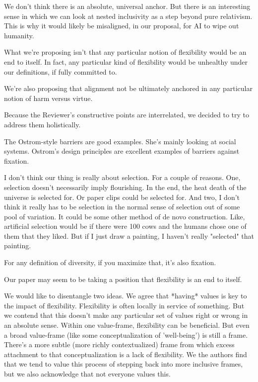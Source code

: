 \documentclass[fontsize=11.5pt]{scrartcl}
\newcounter{point}
\begin{document}
We don't think there is an absolute, universal anchor. But there is an interesting sense in which we can look at nested inclusivity as a step beyond pure relativism. This is why it would likely be misaligned, in our proposal, for AI to wipe out humanity. 

What we're proposing isn't that any particular notion of flexibility would be an end to itself. In fact, any particular kind of flexibility would be unhealthy under our definitions, if fully committed to. 


We're also proposing that alignment not be ultimately anchored in any particular notion of harm versus virtue. 


Because the Reviewer's constructive points are interrelated, we decided to try to address them holistically.


The Ostrom-style barriers are good examples. She's mainly looking at social systems. Ostrom's design principles are excellent examples of barriers against fixation. 

I don't think our thing is really about selection. For a couple of reasons. One, selection doesn't necessarily imply flourishing. In the end, the heat death of the universe is selected for. Or paper clips could be selected for. And two, I don't think it really has to be selection in the normal sense of selection out of some pool of variation. It could be some other method of de novo construction. Like, artificial selection would be if there were 100 cows and the humans chose one of them that they liked. But if I just draw a painting, I haven't really "selected" that painting.

For any definition of diversity, if you maximize that, it's also fixation.



Our paper may seem to be taking a position that flexibility is an end to itself.

We would like to disentangle two ideas. We agree that *having* values is key to the impact of flexibility. Flexibility is often locally in service of something. But we contend that this doesn't make any particular set of values right or wrong in an absolute sense. Within one value-frame, flexibility can be beneficial. But even a broad value-frame (like some conceptualization of 'well-being') is still a frame. There's a more subtle (more richly contextualized) frame from which excess attachment to that conceptualization is a lack of flexibility. We the authors find that we tend to value this process of stepping back into more inclusive frames, but we also acknowledge that not everyone values this.
\end{document}
